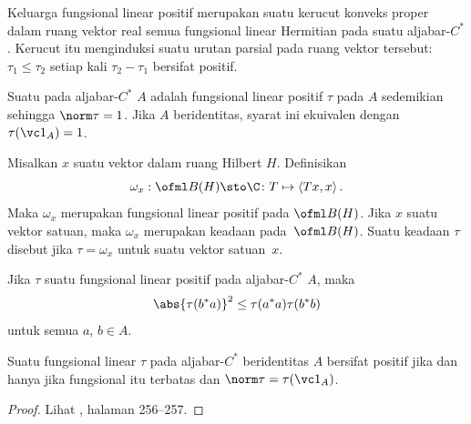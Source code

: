 \begin{prop} Keluarga fungsional linear positif merupakan suatu kerucut konveks proper dalam ruang
vektor real semua fungsional linear Hermitian pada suatu aljabar-$C^*$. Kerucut itu menginduksi suatu
urutan parsial pada ruang vektor tersebut: $\tau_1 \le \tau_2$ setiap kali $\tau_2 - \tau_1$
bersifat positif.
\end{prop}

\begin{defn} Suatu
 pada aljabar-$C^*$ $A$ adalah fungsional linear positif $\tau$ pada $A$ sedemikian sehingga
$\norm\tau = 1$. Jika $A$ beridentitas, syarat ini ekuivalen dengan $\tau(\vc 1_A) = 1$.
\end{defn}

\begin{exam} Misalkan $x$ suatu vektor dalam ruang Hilbert $H$. Definisikan
   \[ \omega_x:\ofml B(H) \sto \C\colon T \mapsto \langle Tx,x \rangle\,. \]
Maka $\omega_x$ merupakan fungsional linear positif pada $\ofml B(H)$. Jika $x$ suatu
vektor satuan, maka $\omega_x$ merupakan keadaan pada~$\ofml B(H)$. Suatu keadaan $\tau$ disebut
 jika $\tau = \omega_x$ untuk suatu vektor satuan~$x$.
\end{exam}

\begin{prop}\label{0025105} Jika $\tau$ suatu fungsional linear positif pada
aljabar-$C^*$ $A$, maka
   \[ \abs{\tau(b^*a)}^2 \le \tau(a^*a)\tau(b^*b) \]
untuk semua $a$, $b \in A$.
\end{prop}

\begin{prop} Suatu fungsional linear $\tau$ pada aljabar-$C^*$ beridentitas $A$ bersifat positif jika dan hanya jika
fungsional itu terbatas dan $\norm\tau = \tau(\vc 1_A)$.
\end{prop}

\begin{proof} Lihat \cite{KadisonR:1983}, halaman 256--257. \ns
\end{proof}



















